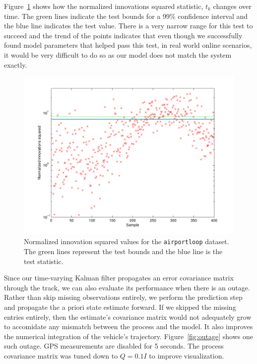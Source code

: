 Figure~\ref{fig:nis} shows how the normalized innovations squared statistic, $t_k$ changes over time.  The green lines indicate the test bounds for a 99\% confidence interval and the blue line indicates the test value.  There is a very narrow range for this test to succeed and the trend of the points indicates that even though we successfully found model parameters that helped pass this test, in real world online scenarios, it would be very difficult to do so as our model does not match the system exactly.

\begin{figure}[!b]
\includegraphics[width=\columnwidth]{nis}
\caption{Normalized innovation squared values for the \texttt{airportloop} dataset.  The green lines represent the test bounds and the blue line is the test statistic.}
\label{fig:nis}
\end{figure}

Since our time-varying Kalman filter propagates an error covariance matrix through the track, we can also evaluate its performance when there is an outage.  Rather than skip missing observations entirely, we perform the prediction step and propagate the a priori state estimate forward.  If we skipped the missing entries entirely, then the estimate's covariance matrix would not adequately grow to accomidate any mismatch between the process and the model.  It also improves the numerical integration of the vehicle's trajectory.  Figure~\ref{fig:outage} shows one such outage.  GPS measurements are disabled for 5 seconds.  The process covariance matrix was tuned down to $Q = 0.1I$ to improve visualization.

